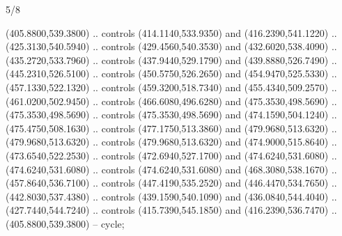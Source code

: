 \begin{flagdescription}{5/8}
\begin{scope}[shift={(m)}]
\begin{scope}[scale=\flagwidth/220,y=0.1mm, x=0.1mm, yscale=-1,shift={(-596,-360)}]
\begin{scope}[cm={{-1.0,0.0,0.0,1.0,(1193.9797,0.0)}}]
\begin{scope}[draw=black,line join=round,line cap=round,line width=0.381\lw]
\begin{scope}[line width=0.534\lw,fill=green]
 (405.8800,539.3800) .. controls (414.1140,533.9350) and
  (416.2390,541.1220) .. (425.3130,540.5940) .. controls (429.4560,540.3530) and
  (432.6020,538.4090) .. (435.2720,533.7960) .. controls (437.9440,529.1790) and
  (439.8880,526.7490) .. (445.2310,526.5100) .. controls (450.5750,526.2650) and
  (454.9470,525.5330) .. (457.1330,522.1320) .. controls (459.3200,518.7340) and
  (455.4340,509.2570) .. (461.0200,502.9450) .. controls (466.6080,496.6280) and
  (475.3530,498.5690) .. (475.3530,498.5690) .. controls (475.3530,498.5690) and
  (474.1590,504.1240) .. (475.4750,508.1630) .. controls (477.1750,513.3860) and
  (479.9680,513.6320) .. (479.9680,513.6320) .. controls (479.9680,513.6320) and
  (474.9000,515.8640) .. (473.6540,522.2530) .. controls (472.6940,527.1700) and
  (474.6240,531.6080) .. (474.6240,531.6080) .. controls (474.6240,531.6080) and
  (468.3080,538.1670) .. (457.8640,536.7100) .. controls (447.4190,535.2520) and
  (446.4470,534.7650) .. (442.8030,537.4380) .. controls (439.1590,540.1090) and
  (436.0840,544.4040) .. (427.7440,544.7240) .. controls (415.7390,545.1850) and
  (416.2390,536.7470) .. (405.8800,539.3800) -- cycle;


\end{scope}
\end{scope}
\end{scope}
\end{scope}
\end{scope}
\end{flagdescription}
